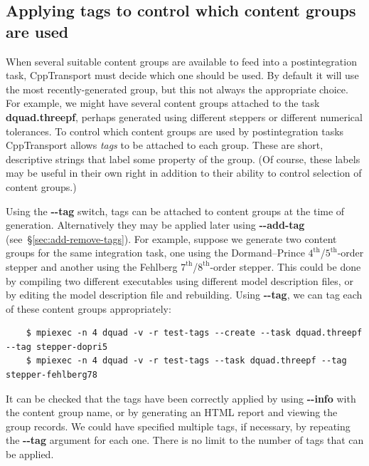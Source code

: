 \documentclass[11pt,a4paper]{article}
\newcommand{\repoobject}[1]{{\ttfamily\bfseries\small #1}}
\newcommand{\packagefont}{\sffamily}
\newcommand{\CppTransport}{{\packagefont CppTransport}}
\newcommand{\option}[1]{{\ttfamily\bfseries\small #1}}
\begin{document}
\subsection{Applying tags to control which content groups are used}
When several suitable content groups are available
to feed into a postintegration task,
{\CppTransport} must decide which one should be used.
By default it will use the most recently-generated group, but this
not always the appropriate choice.
For example, we might have several content groups attached to the
task \repoobject{dquad.threepf}, perhaps generated using
different steppers or different numerical tolerances.
To control which content groups are used by postintegration tasks
{\CppTransport} allows \emph{tags} to be attached to each group.
These are short, descriptive strings that label some property
of the group.
(Of course, these labels may be useful in their own right in addition
to their ability to control selection of content groups.)

Using the \option{{-}{-}tag} switch,
tags can be attached to content groups at the time of generation.
Alternatively
they may be applied later
using \option{{-}{-}add-tag}
(see~\S\ref{sec:add-remove-tags}).
For example, suppose we generate two content groups
for the same integration task,
one
using the
Dormand--Prince $4^{\mathrm{th}}$/$5^{\mathrm{th}}$-order
stepper and another using the
Fehlberg $7^{\mathrm{th}}$/$8^{\mathrm{th}}$-order stepper.
This could be done
by compiling two different executables using different
model description files, or by editing the model description file
and rebuilding.
Using \option{{-}{-}tag},
we can tag each of these content groups appropriately:
\begin{verbatim}
    $ mpiexec -n 4 dquad -v -r test-tags --create --task dquad.threepf --tag stepper-dopri5
    $ mpiexec -n 4 dquad -v -r test-tags --task dquad.threepf --tag stepper-fehlberg78
\end{verbatim}
It can be checked that the tags have been correctly applied
by using \option{{-}{-}info} with the content group
name, or by generating an HTML report
and viewing the group records.
We could have specified multiple tags, if necessary, by repeating
the \option{{-}{-}tag} argument for each one.
There is no limit to the number of tags that can be applied.
\end{document}
